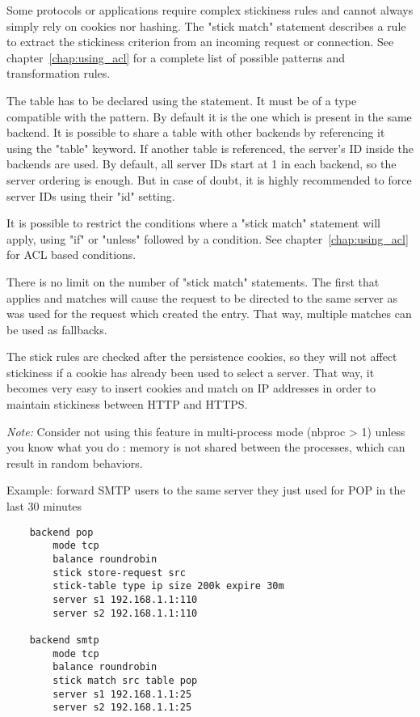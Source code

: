 {  Some protocols or applications require complex stickiness rules and cannot
  always simply rely on cookies nor hashing. The "stick match" statement
  describes a rule to extract the stickiness criterion from an incoming request
  or connection. See chapter~\ref{chap:using_acl} for a complete list of possible patterns and
  transformation rules.

  The table has to be declared using the  statement. It must be of
  a type compatible with the pattern. By default it is the one which is present
  in the same backend. It is possible to share a table with other backends by
  referencing it using the "table" keyword. If another table is referenced,
  the server's ID inside the backends are used. By default, all server IDs
  start at 1 in each backend, so the server ordering is enough. But in case of
  doubt, it is highly recommended to force server IDs using their "id" setting.

  It is possible to restrict the conditions where a "stick match" statement
  will apply, using "if" or "unless" followed by a condition. See chapter~\ref{chap:using_acl} for
  ACL based conditions.

  There is no limit on the number of "stick match" statements. The first that
  applies and matches will cause the request to be directed to the same server
  as was used for the request which created the entry. That way, multiple
  matches can be used as fallbacks.

  The stick rules are checked after the persistence cookies, so they will not
  affect stickiness if a cookie has already been used to select a server. That
  way, it becomes very easy to insert cookies and match on IP addresses in
  order to maintain stickiness between HTTP and HTTPS.

  \emph{Note:} Consider not using this feature in multi-process mode (nbproc > 1)
         unless you know what you do : memory is not shared between the
         processes, which can result in random behaviors.

  Example: forward SMTP users to the same server they just used for POP in the last 30 minutes
  \begin{verbatim}
    backend pop
        mode tcp
        balance roundrobin
        stick store-request src
        stick-table type ip size 200k expire 30m
        server s1 192.168.1.1:110
        server s2 192.168.1.1:110

    backend smtp
        mode tcp
        balance roundrobin
        stick match src table pop
        server s1 192.168.1.1:25
        server s2 192.168.1.1:25
  \end{verbatim}

}
